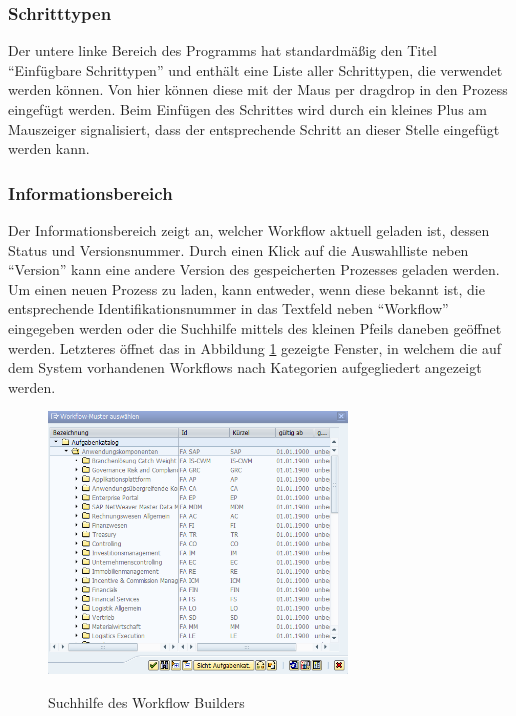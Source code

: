 \subsubsection{Schritttypen}
\label{sec:win-overview-schrittypen}
Der untere linke Bereich des Programms hat standardmäßig den Titel "`Einfügbare Schrittypen"' und enthält eine Liste aller Schrittypen, die verwendet werden können. Von hier können diese mit der Maus per \gls{dragdrop} in den Prozess eingefügt werden. Beim Einfügen des Schrittes wird durch ein kleines Plus am Mauszeiger signalisiert, dass der entsprechende Schritt an dieser Stelle eingefügt werden kann.

\subsubsection{Informationsbereich}
\label{sec:win-overview-information}
Der Informationsbereich zeigt an, welcher Workflow aktuell geladen ist, dessen Status und Versionsnummer. Durch einen Klick auf die Auswahlliste neben "`Version"' kann eine andere Version des gespeicherten Prozesses geladen werden. Um einen neuen Prozess zu laden, kann entweder, wenn diese bekannt ist, die entsprechende Identifikationsnummer in das Textfeld neben "`Workflow"' eingegeben werden oder die Suchhilfe mittels des kleinen Pfeils daneben geöffnet werden. Letzteres öffnet das in Abbildung \ref{abb:workflow-search} gezeigte Fenster, in welchem die auf dem System vorhandenen Workflows nach Kategorien aufgegliedert angezeigt werden.

\begin{figure}[h]
	\begin{center}
	\includegraphics[width=300px]{grafiken/wf-builder_search.png}
	\caption{Suchhilfe des Workflow Builders}
	\vspace{-10pt}
	\label{abb:workflow-search}
	\end{center}
\end{figure}

